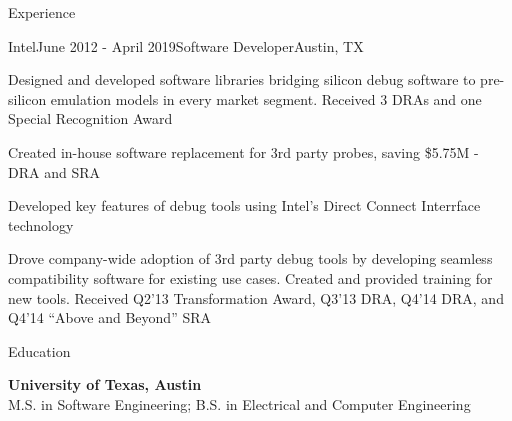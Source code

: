 \documentclass{resume} %
\begin{document}
\begin{rSection}{Experience}
\begin{rSubsection}{Intel}{June 2012 - April 2019}{Software Developer}{Austin, TX}
\item Designed and developed software libraries bridging silicon debug software to pre-silicon emulation models in every market segment. Received 3 DRAs and one Special Recognition Award
\item Created in-house software replacement for 3rd party probes, saving \$5.75M - DRA and SRA
\item Developed key features of debug tools using Intel's Direct Connect Interrface technology
\item Drove company-wide adoption of 3rd party debug tools by developing seamless compatibility software for existing use cases. Created and provided training for new tools. Received Q2'13 Transformation Award, Q3'13 DRA, Q4'14 DRA, and Q4'14 ``Above and Beyond'' SRA
\end{rSubsection}

\end{rSection}


\begin{rSection}{Education}

{\bf University of Texas, Austin}  \\ 
M.S. in Software Engineering; B.S. in Electrical and Computer Engineering \\

\end{rSection}
\end{document}
